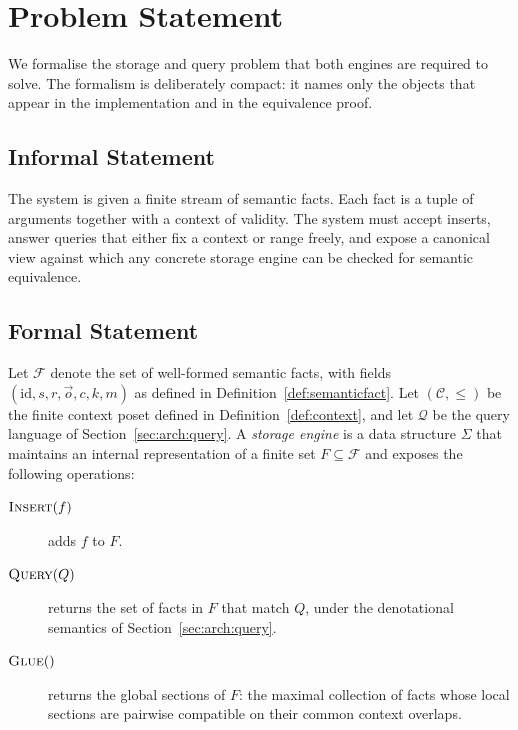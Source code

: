 \section{Problem Statement}
\label{sec:problem}

We formalise the storage and query problem that both engines are required to
solve. The formalism is deliberately compact: it names only the objects that
appear in the implementation and in the equivalence proof.

\subsection{Informal Statement}
\label{sec:problem:informal}

The system is given a finite stream of semantic facts. Each fact is a tuple
of arguments together with a context of validity. The system must accept
inserts, answer queries that either fix a context or range freely, and expose
a canonical view against which any concrete storage engine can be checked for
semantic equivalence.

\subsection{Formal Statement}
\label{sec:problem:formal}

Let $\mathcal{F}$ denote the set of well-formed semantic facts, with fields
$(\mathrm{id}, s, r, \vec{o}, c, k, m)$ as defined in
Definition~\ref{def:semanticfact}. Let $(\mathcal{C}, \leq)$ be the finite
context poset defined in Definition~\ref{def:context}, and let $\mathcal{Q}$
be the query language of Section~\ref{sec:arch:query}. A \emph{storage
engine} is a data structure $\Sigma$ that maintains an internal representation
of a finite set $F \subseteq \mathcal{F}$ and exposes the following
operations:

\begin{description}
    \item[$\textsc{Insert}(f)$] adds $f$ to $F$.
    \item[$\textsc{Query}(Q)$] returns the set of facts in $F$ that match
          $Q$, under the denotational semantics of Section~\ref{sec:arch:query}.
    \item[$\textsc{Glue}()$] returns the global sections of $F$: the maximal
          collection of facts whose local sections are pairwise compatible
          on their common context overlaps.
\end{description}

